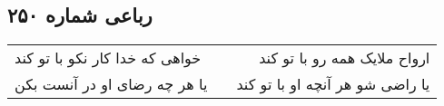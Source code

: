 \begin{center}
\section*{رباعی شماره ۲۵۰}
\label{sec:sh250}
\begin{longtable}{l p{0.5cm} r}
خواهی که خدا کار نکو با تو کند
&&
ارواح ملایک همه رو با تو کند
\\
یا هر چه رضای او در آنست بکن
&&
یا راضی شو هر آنچه او با تو کند
\\
\end{longtable}
\end{center}
